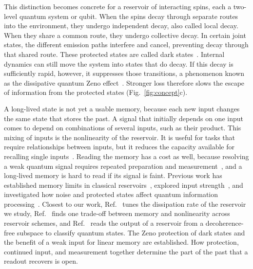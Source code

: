 This distinction becomes concrete for a reservoir of interacting spins, each a two-level quantum system or qubit. When the spins
decay through separate routes into the environment, they undergo independent decay, also called local decay. When they share a common route, they
undergo collective decay. In certain joint states, the different emission paths interfere and cancel, preventing decay
through that shared route. These protected states are called dark
states~\cite{Dicke1954,AsenjoGarcia2017,Facchinetti2016}. Internal dynamics can still move the system into states that
do decay. If this decay is sufficiently rapid, however, it suppresses those transitions, a phenomenon known as the
dissipative quantum Zeno effect~\cite{FacchiPascazio2002,Zanardi2014,Burgarth2019,Reiter2012}. Stronger loss
therefore slows the escape of information from the protected states (Fig.~\ref{fig:concept}c).

A long-lived state is not yet a usable memory, because each new input changes the same state that stores the past.
A signal that initially depends on one input comes to depend on combinations of several inputs, such as their
product. This mixing of inputs is the nonlinearity of the reservoir. It is useful for tasks that require
relationships between inputs, but it reduces the capacity
available for recalling single inputs~\cite{Dambre2012,Inubushi2017,Cindrak2026}. Reading the memory has a cost as
well, because resolving a weak quantum signal requires repeated preparation and
measurement~\cite{Mujal2023,Cindrak2024,Hu2023}, and a long-lived memory is hard to read if its signal is faint.
Previous work has established memory limits in classical reservoirs~\cite{JaegerESP2001,White2004,Ganguli2008},
explored input strength~\cite{Jaeger2007Leaky}, and investigated how noise and protected states affect quantum
information processing~\cite{Kubota2023,Fry2023,Cheamsawat2025,Akshay2026}. Closest to our work,
Ref.~\cite{Sannia2024} tunes the dissipation rate of the reservoir we study, Ref.~\cite{Cindrak2026} finds one
trade-off between memory and nonlinearity across reservoir schemes, and Ref.~\cite{Akshay2026} reads the output of a
reservoir from a decoherence-free subspace to classify quantum states. The Zeno protection of dark states and the
benefit of a weak input for linear memory are established. How protection, continued input, and measurement together
determine the part of the past that a readout recovers is open.

